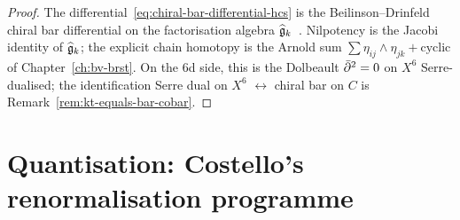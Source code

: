 \begin{proof}
The differential~\eqref{eq:chiral-bar-differential-hcs} is the
Beilinson--Drinfeld chiral bar differential on the factorisation
algebra $\widehat{\mathfrak{g}}_k$~\cite{BD04}. Nilpotency is the Jacobi identity
of $\widehat{\mathfrak{g}}_k$; the explicit chain homotopy is the Arnold sum
$\sum \eta_{ij}\wedge\eta_{jk}+\text{cyclic}$ of
Chapter~\ref{ch:bv-brst}. On the 6d side,
this is the Dolbeault $\bar\partial^2 = 0$ on $X^6$ Serre-dualised; the
identification Serre dual on $X^6$ $\longleftrightarrow$ chiral bar
on $C$ is Remark~\ref{rem:kt-equals-bar-cobar}.
\end{proof}

\section{Quantisation: Costello's renormalisation programme}
\label{sec:hcs-quantisation}

